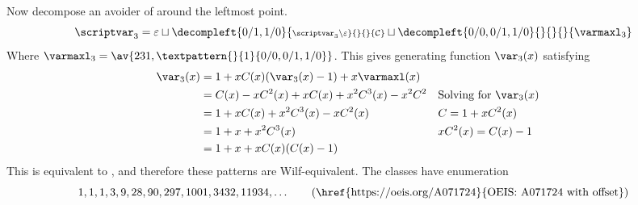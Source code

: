 Now decompose an avoider of 
around the leftmost point.
\begin{equation*}
    \scriptvar_3 = \varepsilon \sqcup
    \decompleft{0/1,1/0}{\scriptstyle \scriptvar_3\setminus\varepsilon}{}{}{\mathcal{C}}
    \sqcup \decompleft{0/0,0/1,1/0}{}{}{}{\varmaxl_3}
\end{equation*}
Where \(\mathcal{\varmaxl}_3 = \av{231,\textpattern{}{1}{0/0,0/1,1/0}}\).
This gives generating function \(\var_3(x)\) satisfying
\begin{equation*}
    \begin{aligned}
        \var_3(x) &= 1 +xC(x)(\var_3(x)-1) + x\varmaxl(x)\\
        &= C(x) - xC^2(x) + xC(x) +x^2C^3(x) - x^2C^2 && \text{Solving for \(\var_3(x)\)}\\
        &= 1 + xC(x) +x^2C^3(x)-xC^2(x) && C = 1+xC^2(x)\\
        &= 1 + x + x^2C^3(x) && xC^2(x) = C(x)-1\\
        &= 1 + x + xC(x)(C(x)-1)
    \end{aligned}
\end{equation*}
This is equivalent to , and therefore these patterns are Wilf-equivalent.
The classes have enumeration
\begin{equation*}
    1, 1, 1, 3, 9, 28, 90, 297, 1001, 3432, 11934,\dotsc \tag{\href{https://oeis.org/A071724}{OEIS: A071724 with offset}}
\end{equation*}
